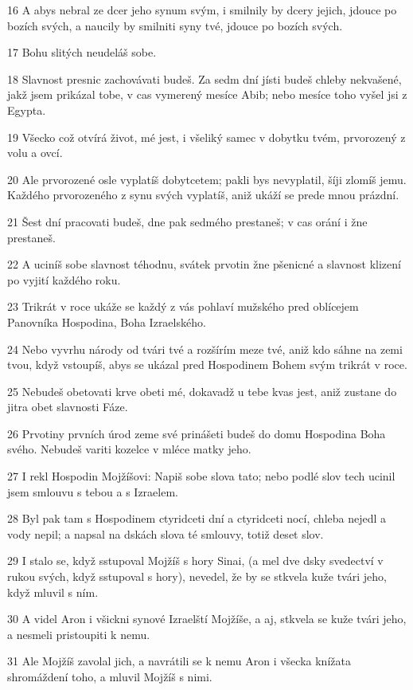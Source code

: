 \par 16 A abys nebral ze dcer jeho synum svým, i smilnily by dcery jejich, jdouce po bozích svých, a naucily by smilniti syny tvé, jdouce po bozích svých.
\par 17 Bohu slitých neudeláš sobe.
\par 18 Slavnost presnic zachovávati budeš. Za sedm dní jísti budeš chleby nekvašené, jakž jsem prikázal tobe, v cas vymerený mesíce Abib; nebo mesíce toho vyšel jsi z Egypta.
\par 19 Všecko což otvírá život, mé jest, i všeliký samec v dobytku tvém, prvorozený z volu a ovcí.
\par 20 Ale prvorozené osle vyplatíš dobytcetem; pakli bys nevyplatil, šíji zlomíš jemu. Každého prvorozeného z synu svých vyplatíš, aniž ukáží se prede mnou prázdní.
\par 21 Šest dní pracovati budeš, dne pak sedmého prestaneš; v cas orání i žne prestaneš.
\par 22 A uciníš sobe slavnost téhodnu, svátek prvotin žne pšenicné a slavnost klizení po vyjití každého roku.
\par 23 Trikrát v roce ukáže se každý z vás pohlaví mužského pred oblícejem Panovníka Hospodina, Boha Izraelského.
\par 24 Nebo vyvrhu národy od tvári tvé a rozšírím meze tvé, aniž kdo sáhne na zemi tvou, když vstoupíš, abys se ukázal pred Hospodinem Bohem svým trikrát v roce.
\par 25 Nebudeš obetovati krve obeti mé, dokavadž u tebe kvas jest, aniž zustane do jitra obet slavnosti Fáze.
\par 26 Prvotiny prvních úrod zeme své prinášeti budeš do domu Hospodina Boha svého. Nebudeš variti kozelce v mléce matky jeho.
\par 27 I rekl Hospodin Mojžíšovi: Napiš sobe slova tato; nebo podlé slov tech ucinil jsem smlouvu s tebou a s Izraelem.
\par 28 Byl pak tam s Hospodinem ctyridceti dní a ctyridceti nocí, chleba nejedl a vody nepil; a napsal na dskách slova té smlouvy, totiž deset slov.
\par 29 I stalo se, když sstupoval Mojžíš s hory Sinai, (a mel dve dsky svedectví v rukou svých, když sstupoval s hory), nevedel, že by se stkvela kuže tvári jeho, když mluvil s ním.
\par 30 A videl Aron i všickni synové Izraelští Mojžíše, a aj, stkvela se kuže tvári jeho, a nesmeli pristoupiti k nemu.
\par 31 Ale Mojžíš zavolal jich, a navrátili se k nemu Aron i všecka knížata shromáždení toho, a mluvil Mojžíš s nimi.

